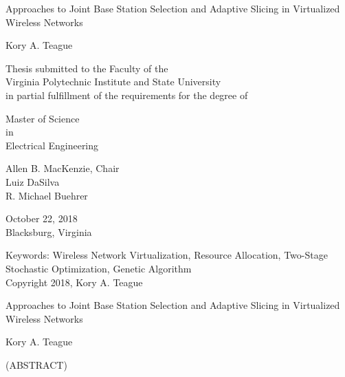 \documentclass[12pt,dvipsnames]{report}
\begin{document}
\thispagestyle{empty}
\begin{center}

{\Large 
Approaches to Joint Base Station Selection and Adaptive Slicing in Virtualized Wireless Networks
}

\vfill

Kory A. Teague

\vfill

Thesis submitted to the Faculty of the \\
Virginia Polytechnic Institute and State University \\
in partial fulfillment of the requirements for the degree of

\vfill

Master of Science \\
in \\
Electrical Engineering

\vfill

Allen B. MacKenzie, Chair \\
Luiz DaSilva \\
R. Michael Buehrer

\vfill

October 22, 2018\\
Blacksburg, Virginia

\vfill

Keywords: Wireless Network Virtualization, Resource Allocation, Two-Stage Stochastic Optimization, Genetic Algorithm \\
Copyright 2018, Kory A. Teague

\end{center}

\pagebreak

\thispagestyle{empty}
\begin{center}

{\large Approaches to Joint Base Station Selection and Adaptive Slicing in Virtualized Wireless Networks}

\vfill

Kory A. Teague

\vfill

(ABSTRACT)

\vfill

\end{center}
\end{document}
